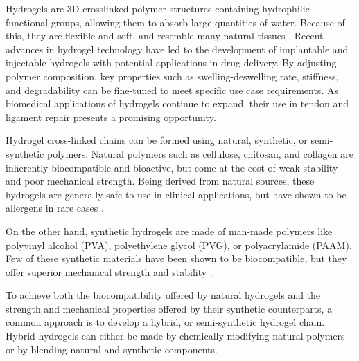 Hydrogels are 3D crosslinked polymer structures containing hydrophilic functional groups, allowing them to absorb large quantities of water. Because of this, they are flexible and soft, and resemble many natural tissues \autocite{hoHydrogelsPropertiesApplications2022}.
Recent advances in hydrogel technology have led to the development of implantable and injectable hydrogels with potential applications in drug delivery. By adjusting polymer composition, key properties such as swelling-deswelling rate, stiffness, and degradability can be fine-tuned to meet specific use case requirements. As biomedical applications of hydrogels continue to expand, their use in tendon and ligament repair presents a promising opportunity.

Hydrogel cross-linked chains can be formed using natural, synthetic, or semi-synthetic polymers. Natural polymers such as cellulose, chitosan, and collagen are inherently biocompatible and bioactive, but come at the cost of weak stability and poor mechanical strength. Being derived from natural sources, these hydrogels are generally safe to use in clinical applications, but have shown to be allergens in rare cases \autocite{hoHydrogelsPropertiesApplications2022}.

On the other hand, synthetic hydrogels are made of man-made polymers like polyvinyl alcohol (PVA), polyethylene glycol (PVG), or polyacrylamide (PAAM). Few of these synthetic materials have been shown to be biocompatible, but they offer superior mechanical strength and stability \autocite{hoHydrogelsPropertiesApplications2022}.

To achieve both the biocompatibility offered by natural hydrogels and the strength and mechanical properties offered by their synthetic counterparts, a common approach is to develop a hybrid, or semi-synthetic hydrogel chain. Hybrid hydrogels can either be made by chemically modifying natural polymers or by blending natural and synthetic components.